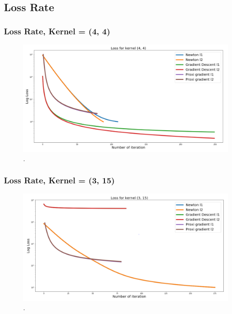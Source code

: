 \documentclass[hyperref={pdfpagelabels=false}]{beamer}
\begin{document}
\subsection{Loss Rate}
\begin{frame}
\frametitle{Loss Rate, Kernel = (4, 4)}

\begin{center}
\begin{figure}[h]
\begin{adjustwidth}{-0.3cm}{0.9 cm}
\includegraphics[scale=0.4]{loss_small.png}
\end{adjustwidth}
\caption{.}
\end{figure}
\end{center}

\end{frame}
\begin{frame}
\frametitle{Loss Rate, Kernel = (3, 15)}

\begin{figure}[h]
\begin{adjustwidth}{-0.5cm}{-0.9 cm}
\includegraphics[scale=0.4]{loss_big.png}
\end{adjustwidth}
\caption{.}
\end{figure}

\end{frame}
\end{document}

